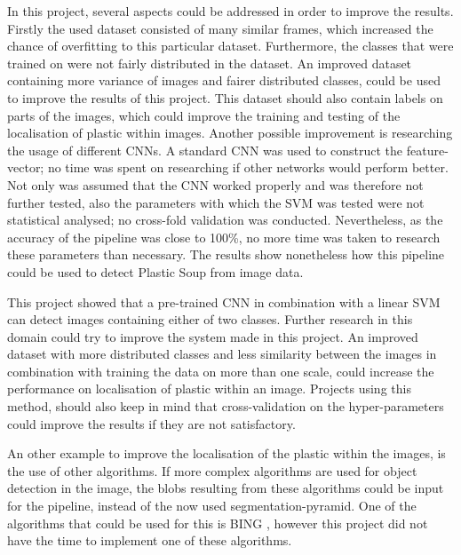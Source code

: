In this project, several aspects could be addressed in order to improve the results.
Firstly the used dataset consisted of many similar frames, which increased the chance of overfitting to this particular dataset.
Furthermore, the classes that were trained on were not fairly distributed in the dataset.
An improved dataset containing more variance of images and fairer distributed classes, could be used to improve the results of this project.
This dataset should also contain labels on parts of the images, which could improve the training and testing of the localisation of plastic within images.
Another possible improvement is researching the usage of different CNNs.
A standard CNN was used to construct the feature-vector; no time was spent on researching if other networks would perform better.
Not only was assumed that the CNN worked properly and was therefore not further tested, also the parameters with which the SVM was tested were not statistical analysed; no cross-fold validation was conducted.
Nevertheless, as the accuracy of the pipeline was close to 100\%, no more time was taken to research these parameters than necessary.
The results show nonetheless how this pipeline could be used to detect Plastic Soup from image data.

This project showed that a pre-trained CNN in combination with a linear SVM can detect images containing either of two classes.
Further research in this domain could try to improve the system made in this project.
An improved dataset with more distributed classes and less similarity between the images in combination with training the data on more than one scale, could increase the performance on localisation of plastic within an image.
Projects using this method, should also keep in mind that cross-validation on the hyper-parameters could improve the results if they are not satisfactory.

An other example to improve the localisation of the plastic within the images, is the use of other algorithms.
If more complex algorithms are used for object detection in the image, the blobs resulting from these algorithms could be input for the pipeline, instead of the now used segmentation-pyramid.
One of the algorithms that could be used for this is BING \citep{BingObj2014}, however this project did not have the time to implement one of these algorithms.

